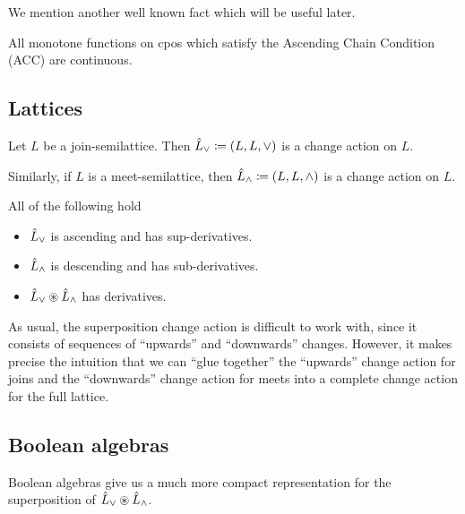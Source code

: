 We mention another well known fact which will be useful later.

\begin{prop}
\label{prop:monotoneContinuous}
  All monotone functions on cpos which satisfy the Ascending Chain Condition
  (ACC) are continuous.
\end{prop}

\subsection{Lattices}

\begin{defn}
  Let $L$ be a join-semilattice. Then $\hat{L}_\vee \coloneqq (L,L,\vee)$ is a change
  action on $L$.

  Similarly, if $L$ is a meet-semilattice, then $\hat{L}_\wedge \coloneqq (L,L,\wedge)$ is a change
  action on $L$.
\end{defn}

\begin{prop}
  All of the following hold
  \begin{itemize}
    \item $\hat{L}_\vee$ is ascending and has sup-derivatives.
    \item $\hat{L}_\wedge$ is descending and has sub-derivatives.
    \item $\hat{L}_\vee \circledast \hat{L}_\wedge$ has derivatives.
  \end{itemize}
\end{prop}

As usual, the superposition change action is difficult to work with, since it
consists of sequences of ``upwards'' and ``downwards'' changes. However, it
makes precise the intuition that we can ``glue together'' the ``upwards'' change
action for joins and the ``downwards'' change action for meets into a
complete change action for the full lattice.

\subsection{Boolean algebras}

Boolean algebras give us a much more compact representation for the
superposition of $\hat{L}_\vee \circledast \hat{L}_\wedge$.

